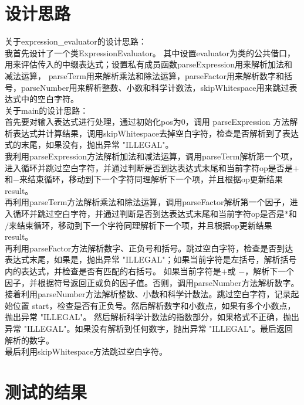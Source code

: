 \documentclass[UTF8]{ctexart}
\begin{document}
\pagestyle{fancy}
\fancyhead{}

\section{设计思路}
\indent 关于expression\_evaluator的设计思路：\\
\indent 我首先设计了一个类ExpressionEvaluator。
其中设置evaluator为类的公共借口，用来评估传入的中缀表达式；设置私有成员函数parseExpression用来解析加法和减法运算，
parseTerm用来解析乘法和除法运算，parseFactor用来解析数字和括号，parseNumber用来解析整数、小数和科学计数法，skipWhitespace用来跳过表达式中的空白字符。\\
\indent 关于main的设计思路：\\
\indent 首先要对输入表达式进行处理，通过初始化pos为0，调用 parseExpression 方法解析表达式并计算结果，调用skipWhitespace去掉空白字符，检查是否解析到了表达式的末尾，如果没有，抛出异常 "ILLEGAL"。\\
我利用parseExpression方法解析加法和减法运算，调用parseTerm解析第一个项，进入循环并跳过空白字符，并通过判断是否到达表达式末尾和当前字符op是否是$+$和$-$来结束循环，移动到下一个字符同理解析下一个项，并且根据op更新结果result。\\
\indent 再利用parseTerm方法解析乘法和除法运算，调用parseFactor解析第一个因子，进入循环并跳过空白字符，并通过判断是否到达表达式末尾和当前字符op是否是$*$和$/$来结束循环，移动到下一个字符同理解析下一个项，并且根据op更新结果result。\\
\indent 再利用parseFactor方法解析数字、正负号和括号。跳过空白字符，检查是否到达表达式末尾，如果是，抛出异常 "ILLEGAL"；如果当前字符是左括号，解析括号内的表达式，并检查是否有匹配的右括号。
如果当前字符是$+$或 $-$，解析下一个因子，并根据符号返回正或负的因子值。否则，调用parseNumber方法解析数字。\\
\indent 接着利用parseNumber方法解析整数、小数和科学计数法。跳过空白字符，记录起始位置 start，检查是否有正负号。然后解析数字和小数点，如果有多个小数点，抛出异常 "ILLEGAL"。
然后解析科学计数法的指数部分，如果格式不正确，抛出异常 "ILLEGAL"。如果没有解析到任何数字，抛出异常 "ILLEGAL"。最后返回解析的数字。\\
最后利用skipWhitespace方法跳过空白字符。\\




\section{测试的结果}
\end{document}
